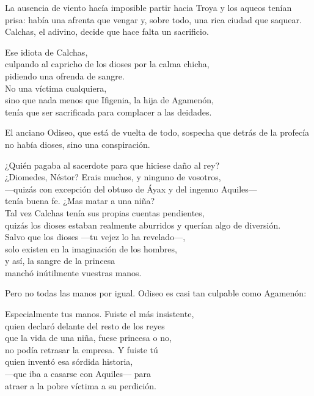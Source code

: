 La ausencia de viento hacía imposible partir hacia Troya y los aqueos tenían prisa: había una afrenta que vengar y, sobre todo, una rica ciudad que saquear. Calchas, el adivino, decide que hace falta un sacrificio.

\begin{versopropio}
Ese idiota de Calchas,\\
culpando al capricho de los dioses por la calma chicha,\\
pidiendo una ofrenda de sangre.\\
No una víctima cualquiera,\\
sino que nada menos que Ifigenia, la hija de Agamenón,\\
tenía que ser sacrificada para complacer a las deidades.
\end{versopropio}

El anciano Odiseo, que está de vuelta de todo, sospecha que detrás de la profecía no había dioses, sino una conspiración.

\begin{versopropio}
¿Quién pagaba al sacerdote para que hiciese daño al rey?\\
¿Diomedes, Néstor? Erais muchos, y ninguno de vosotros,\\
---quizás con excepción del obtuso de Áyax y del ingenuo Aquiles---\\
tenía buena fe. ¿Mas matar a una niña?\\
Tal vez Calchas tenía sus propias cuentas pendientes,\\
quizás los dioses estaban realmente aburridos y querían algo de diversión.\\
Salvo que los dioses ---tu vejez lo ha revelado---,\\
solo existen en la imaginación de los hombres,\\
y así, la sangre de la princesa\\
manchó inútilmente vuestras manos.
\end{versopropio}

Pero no todas las manos por igual. Odiseo es casi tan culpable como Agamenón:

\begin{versopropio}
Especialmente tus manos. Fuiste el más insistente,\\
quien declaró delante del resto de los reyes\\
que la vida de una niña, fuese princesa o no,\\
no podía retrasar la empresa. Y fuiste tú\\
quien inventó esa sórdida historia,\\
---que iba a casarse con Aquiles--- para\\
atraer a la pobre víctima a su perdición.
\end{versopropio}

